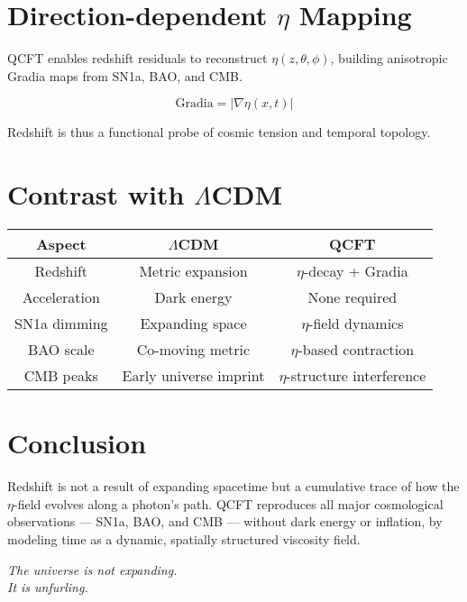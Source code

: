 \documentclass[12pt]{article}
\begin{document}
\section{Direction-dependent $\eta$ Mapping}

QCFT enables redshift residuals to reconstruct $\eta(z, \theta, \phi)$, building anisotropic Gradia maps from SN1a, BAO, and CMB.

\[
\text{Gradia} = |\nabla \eta(x,t)|
\]

Redshift is thus a functional probe of cosmic tension and temporal topology.

\section{Contrast with $\Lambda$CDM}

\begin{tabular}{|c|c|c|}
\hline
Aspect & $\Lambda$CDM & QCFT \\
\hline
Redshift & Metric expansion & $\eta$-decay + Gradia \\
Acceleration & Dark energy & None required \\
SN1a dimming & Expanding space & $\eta$-field dynamics \\
BAO scale & Co-moving metric & $\eta$-based contraction \\
CMB peaks & Early universe imprint & $\eta$-structure interference \\
\hline
\end{tabular}

\section*{Conclusion}

Redshift is not a result of expanding spacetime but a cumulative trace of how the $\eta$-field evolves along a photon's path. QCFT reproduces all major cosmological observations — SN1a, BAO, and CMB — without dark energy or inflation, by modeling time as a dynamic, spatially structured viscosity field.

\begin{center}
\emph{The universe is not expanding.\\
It is unfurling.}
\end{center}
\end{document}
